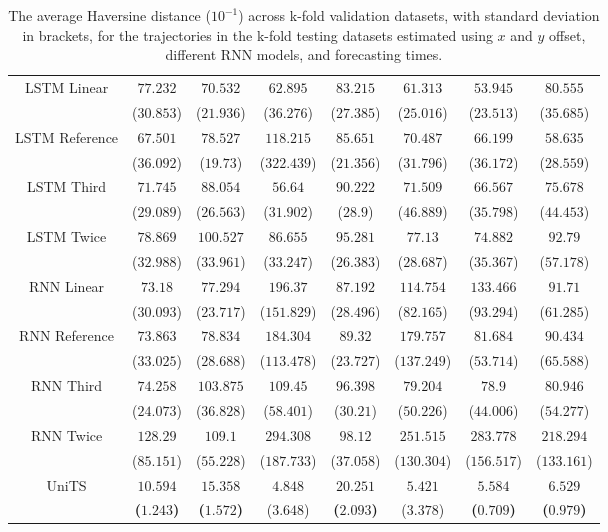 \begin{table}[!ht]
{\begin{tabular}{|c|c|c|c|c|c|c|c|}
			\multirow{2}{*}{LSTM Linear} & $77.232$ & $70.532$ & $62.895$ & $83.215$ & $61.313$ & $53.945$ & $80.555$ \\
			 & ($30.853$) & ($21.936$) & ($36.276$) & ($27.385$) & ($25.016$) & ($23.513$) & ($35.685$) \\ \hline
			\multirow{2}{*}{LSTM Reference} & $67.501$ & $78.527$ & $118.215$ & $85.651$ & $70.487$ & $66.199$ & $58.635$ \\
			 & ($36.092$) & ($19.73$) & ($322.439$) & ($21.356$) & ($31.796$) & ($36.172$) & ($28.559$) \\ \hline
			\multirow{2}{*}{LSTM Third} & $71.745$ & $88.054$ & $56.64$ & $90.222$ & $71.509$ & $66.567$ & $75.678$ \\
			 & ($29.089$) & ($26.563$) & ($31.902$) & ($28.9$) & ($46.889$) & ($35.798$) & ($44.453$) \\ \hline
			\multirow{2}{*}{LSTM Twice} & $78.869$ & $100.527$ & $86.655$ & $95.281$ & $77.13$ & $74.882$ & $92.79$ \\
			 & ($32.988$) & ($33.961$) & ($33.247$) & ($26.383$) & ($28.687$) & ($35.367$) & ($57.178$) \\ \hline
			\multirow{2}{*}{RNN Linear} & $73.18$ & $77.294$ & $196.37$ & $87.192$ & $114.754$ & $133.466$ & $91.71$ \\
			 & ($30.093$) & ($23.717$) & ($151.829$) & ($28.496$) & ($82.165$) & ($93.294$) & ($61.285$) \\ \hline
			\multirow{2}{*}{RNN Reference} & $73.863$ & $78.834$ & $184.304$ & $89.32$ & $179.757$ & $81.684$ & $90.434$ \\
			 & ($33.025$) & ($28.688$) & ($113.478$) & ($23.727$) & ($137.249$) & ($53.714$) & ($65.588$) \\ \hline
			\multirow{2}{*}{RNN Third} & $74.258$ & $103.875$ & $109.45$ & $96.398$ & $79.204$ & $78.9$ & $80.946$ \\
			 & ($24.073$) & ($36.828$) & ($58.401$) & ($30.21$) & ($50.226$) & ($44.006$) & ($54.277$) \\ \hline
			\multirow{2}{*}{RNN Twice} & $128.29$ & $109.1$ & $294.308$ & $98.12$ & $251.515$ & $283.778$ & $218.294$ \\
			 & ($85.151$) & ($55.228$) & ($187.733$) & ($37.058$) & ($130.304$) & ($156.517$) & ($133.161$) \\ \hline
			\multirow{2}{*}{UniTS} & $\mathbf{10.594}$ & $\mathbf{15.358}$ & $4.848$ & $\mathbf{20.251}$ & $5.421$ & $\mathbf{5.584}$ & $\mathbf{6.529}$ \\
			 & \textbf{(}$\mathbf{1.243}$\textbf{)} & \textbf{(}$\mathbf{1.572}$\textbf{)} & ($3.648$) & \textbf{(}$\mathbf{2.093}$\textbf{)} & ($3.378$) & \textbf{(}$\mathbf{0.709}$\textbf{)} & \textbf{(}$\mathbf{0.979}$\textbf{)} \\ \hline
		\end{tabular}
	}
	\caption{The average Haversine distance ($10^{-1}$) across k-fold validation datasets, with standard deviation in brackets, for the trajectories in the k-fold testing datasets estimated using $x$ and $y$ offset, different RNN models, and forecasting times.}
	\label{tab:all_no_abs_haversine}
\end{table}

